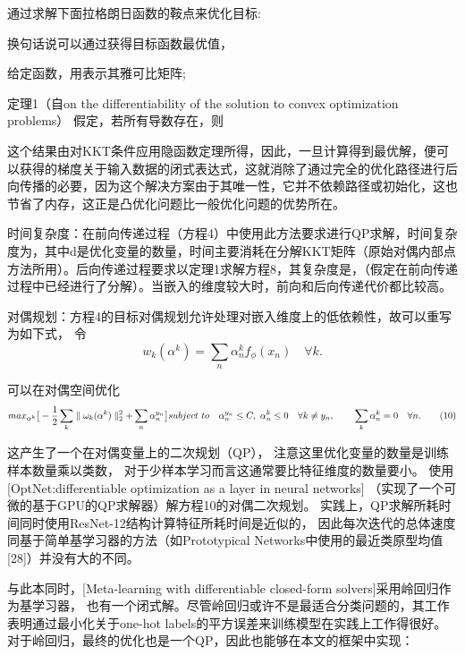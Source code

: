 通过求解下面拉格朗日函数的鞍点来优化目标:

换句话说可以通过获得目标函数最优值，


给定函数，用表示其雅可比矩阵;

定理1（自on the differentiability of the solution to convex optimization problems） 假定，若所有导数存在，则

这个结果由对KKT条件应用隐函数定理所得，因此，一旦计算得到最优解，便可以获得的梯度关于输入数据的闭式表达式，这就消除了通过完全的优化路径进行后向传播的必要，因为这个解决方案由于其唯一性，它并不依赖路径或初始化，这也节省了内存，这正是凸优化问题比一般优化问题的优势所在。

时间复杂度：在前向传递过程（方程4）中使用此方法要求进行QP求解，时间复杂度为，其中d是优化变量的数量，时间主要消耗在分解KKT矩阵（原始对偶内部点方法所用）。后向传递过程要求以定理1求解方程8，其复杂度是，（假定在前向传递过程中已经进行了分解）。当嵌入的维度较大时，前向和后向传递代价都比较高。

对偶规划：方程4的目标对偶规划允许处理对嵌入维度上的低依赖性，故可以重写为如下式，
令
\begin{equation}
    w_{k}(\alpha^{k}) = \sum_{n}{\alpha_{n}^{k} f_{\phi}(x_{n})} \quad \forall k.
\end{equation}

可以在对偶空间优化  
\begin{equation}
    max_{\alpha ^{k}} \big[ -\frac{1}{2} \sum_{k}\parallel\omega_{k}(\alpha^{k})\parallel_{2}^{2} + \sum_{n}\alpha_{n}^{y_{n}}\big]
    \\ subject \ to \quad \alpha_{n}^{y_{n}} \leq C, \ \alpha_{n}^{k} \leq 0 \quad \forall k \neq y_{n} , 
    \\ \qquad \sum_{k}{\alpha_{n}^{k}=0 \quad \forall n.} \tag{10}
\end{equation}

这产生了一个在对偶变量上的二次规划（QP），
注意这里优化变量的数量是训练样本数量乘以类数，
对于少样本学习而言这通常要比特征维度的数量要小。
使用[OptNet:differentiable optimization as a layer in neural networks]
（实现了一个可微的基于GPU的QP求解器）解方程10的对偶二次规划。
实践上，QP求解所耗时间同时使用ResNet-12结构计算特征所耗时间是近似的，
因此每次迭代的总体速度同基于简单基学习器的方法（如Prototypical Networks中使用的最近类原型均值[28]）并没有大的不同。

与此本同时，[Meta-learning with differentiable closed-form solvers]采用岭回归作为基学习器，
也有一个闭式解。尽管岭回归或许不是最适合分类问题的，其工作表明通过最小化关于one-hot labels的平方误差来训练模型在实践上工作得很好。
对于岭回归，最终的优化也是一个QP，因此也能够在本文的框架中实现：

